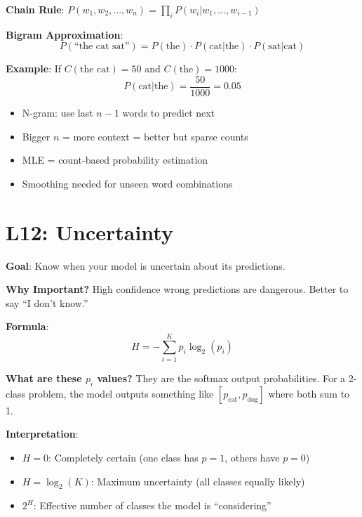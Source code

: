 \documentclass[11pt,a4paper]{article}
\begin{document}
\begin{examplebox}

\textbf{Chain Rule}: $P(w_1, w_2, ..., w_n) = \prod_i P(w_i | w_1, ..., w_{i-1})$

\textbf{Bigram Approximation}:
\[P(\text{``the cat sat''}) = P(\text{the}) \cdot P(\text{cat}|\text{the}) \cdot P(\text{sat}|\text{cat})\]

\textbf{Example}: If $C(\text{the cat}) = 50$ and $C(\text{the}) = 1000$:
\[P(\text{cat}|\text{the}) = \frac{50}{1000} = 0.05\]
\end{examplebox}

\begin{notebox}

\begin{itemize}[leftmargin=*,nosep]
\item N-gram: use last $n-1$ words to predict next
\item Bigger $n$ = more context = better but sparse counts
\item MLE = count-based probability estimation
\item Smoothing needed for unseen word combinations
\end{itemize}
\end{notebox}

\section{L12: Uncertainty}

\begin{definitionbox}

\textbf{Goal}: Know when your model is uncertain about its predictions.

\textbf{Why Important?} High confidence wrong predictions are dangerous. Better to say ``I don't know.''
\end{definitionbox}

\begin{definitionbox}

\textbf{Formula}:
\[H = -\sum_{i=1}^{K} p_i \log_2(p_i)\]

\textbf{What are these $p_i$ values?} They are the softmax output probabilities. For a 2-class problem, the model outputs something like $[p_{\text{cat}}, p_{\text{dog}}]$ where both sum to 1.

\textbf{Interpretation}:
\begin{itemize}[leftmargin=*,nosep]
\item $H = 0$: Completely certain (one class has $p=1$, others have $p=0$)
\item $H = \log_2(K)$: Maximum uncertainty (all classes equally likely)
\item $2^H$: Effective number of classes the model is ``considering''
\end{itemize}
\end{definitionbox}
\end{document}
